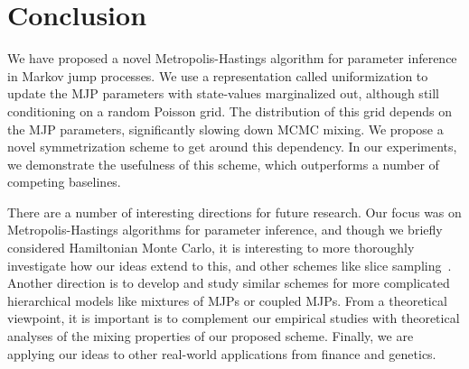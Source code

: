 \section{Conclusion}

We have proposed a novel Metropolis-Hastings algorithm for parameter 
inference in Markov jump processes. We use a representation called 
uniformization to update the MJP parameters with state-values marginalized 
out, although still conditioning on a random Poisson grid. The 
distribution of this grid depends on the MJP parameters, significantly 
slowing down MCMC mixing. We propose a novel symmetrization scheme to get 
around this dependency. In our experiments, we demonstrate the usefulness 
of this scheme, which outperforms a number of competing baselines.

There are a number of interesting directions for future research.
Our focus was on Metropolis-Hastings algorithms for parameter inference,
and though we briefly considered Hamiltonian Monte Carlo, it is interesting
to more thoroughly investigate how our ideas extend to this, and other 
schemes like slice sampling~\cite{Nea2003a}. Another direction is to develop
and study similar schemes for more complicated hierarchical models like
mixtures of MJPs or coupled MJPs. From a theoretical viewpoint, it is
important is to complement our empirical studies with theoretical analyses 
of the mixing properties of our proposed scheme. Finally, we are applying 
our ideas to other real-world applications from finance and genetics.
